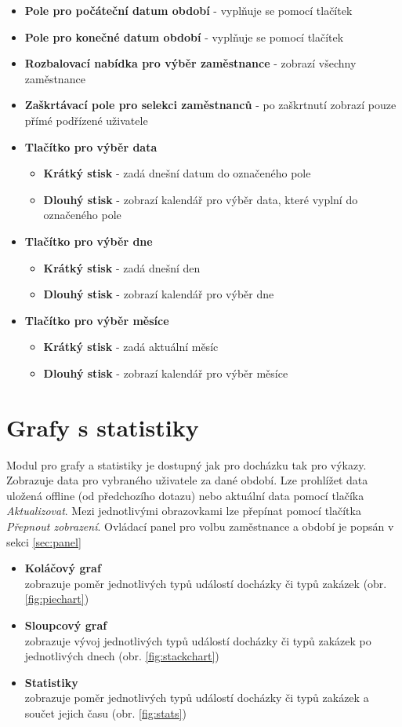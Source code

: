 \documentclass{diplomka}
\begin{document}
\begin{itemize}
\item \textbf{Pole pro počáteční datum období} - vyplňuje se pomocí tlačítek
\item \textbf{Pole pro konečné datum období} - vyplňuje se pomocí tlačítek
\item \textbf{Rozbalovací nabídka pro výběr zaměstnance} - zobrazí všechny zaměstnance
\item \textbf{Zaškrtávací pole pro selekci zaměstnanců} - po zaškrtnutí zobrazí pouze přímé podřízené uživatele
\item \textbf{Tlačítko pro výběr data}
\begin{itemize}[noitemsep,nolistsep]
\item  \textbf{Krátký stisk} - zadá dnešní datum do označeného pole
\item  \textbf{Dlouhý stisk} - zobrazí kalendář pro výběr data, které vyplní do označeného pole
\end{itemize}
\item \textbf{Tlačítko pro výběr dne}
\begin{itemize}[noitemsep,nolistsep]
\item  \textbf{Krátký stisk} - zadá dnešní den
\item  \textbf{Dlouhý stisk} -  zobrazí kalendář pro výběr dne
\end{itemize}
\item \textbf{Tlačítko pro výběr měsíce}
\begin{itemize}[noitemsep,nolistsep]
\item  \textbf{Krátký stisk} - zadá aktuální měsíc
\item  \textbf{Dlouhý stisk} - zobrazí kalendář pro výběr měsíce
\end{itemize}
\end{itemize}

\section{Grafy s statistiky}
\label{sec:charts}
Modul pro grafy a statistiky je dostupný jak pro docházku tak pro výkazy. Zobrazuje data pro vybraného uživatele za dané období. Lze prohlížet data uložená offline (od předchozího dotazu) nebo aktuální data pomocí tlačíka \emph{Aktualizovat}. Mezi jednotlivými obrazovkami lze přepínat pomocí tlačítka \emph{Přepnout zobrazení}. Ovládací panel pro volbu zaměstnance a období je popsán v sekci \ref{sec:panel}
\begin{itemize}[noitemsep,nolistsep]
\item \textbf{Koláčový graf}\\ zobrazuje poměr jednotlivých typů událostí docházky či typů zakázek (obr. \ref{fig:piechart})
\item \textbf{Sloupcový graf}\\zobrazuje vývoj jednotlivých typů událostí docházky či typů zakázek po jednotlivých dnech (obr. \ref{fig:stackchart})
\item \textbf{Statistiky}\\zobrazuje poměr jednotlivých typů událostí docházky či typů zakázek a součet jejich času (obr. \ref{fig:stats})
\end{itemize}
\end{document}
